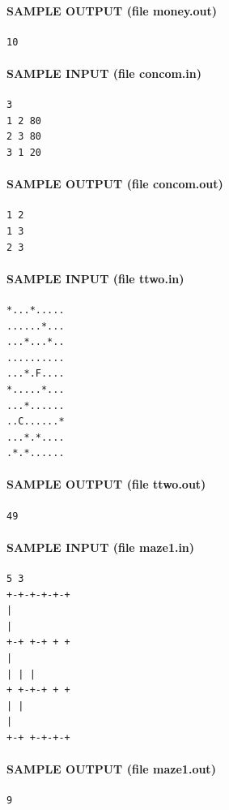\documentclass[11pt]{article}
\begin{document}
\paragraph{SAMPLE OUTPUT (file money.out)}
\begin{verbatim}
10
\end{verbatim}

\paragraph{SAMPLE INPUT (file concom.in)}
\begin{verbatim}
3
1 2 80
2 3 80
3 1 20
\end{verbatim}

\paragraph{SAMPLE OUTPUT (file concom.out)}
\begin{verbatim}
1 2
1 3
2 3
\end{verbatim}

\paragraph{SAMPLE INPUT (file ttwo.in)}
\begin{verbatim}
*...*.....
......*...
...*...*..
..........
...*.F....
*.....*...
...*......
..C......*
...*.*....
.*.*......
\end{verbatim}

\paragraph{SAMPLE OUTPUT (file ttwo.out)}
\begin{verbatim}
49
\end{verbatim}

\paragraph{SAMPLE INPUT (file maze1.in)}
\begin{verbatim}
5 3
+-+-+-+-+-+
|
|
+-+ +-+ + +
|
| | |
+ +-+-+ + +
| |
|
+-+ +-+-+-+
\end{verbatim}

\paragraph{SAMPLE OUTPUT (file maze1.out)}
\begin{verbatim}
9
\end{verbatim}
\end{document}
